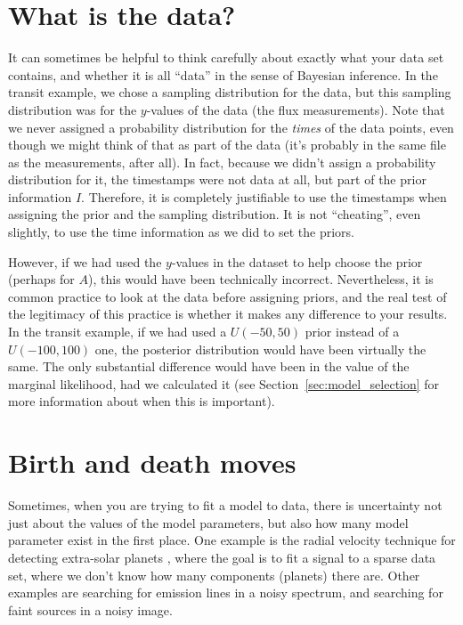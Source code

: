 \section{What is the data?}
It can sometimes be helpful to think carefully about exactly what your data set
contains, and whether it is all ``data'' in the sense of Bayesian inference.
In the transit example, we chose a sampling distribution for the data, but this
sampling distribution was for the $y$-values of the data
(the flux measurements). Note that we never assigned a probability distribution
for the {\it times} of the data points, even though we might think of that as
part of the data (it's probably in the same file as the measurements, after all).
In fact, because we didn't assign a probability distribution for it, the
timestamps were not data at all, but part of the prior information $I$.
Therefore, it is completely justifiable to use the timestamps when assigning
the prior and the sampling distribution. It is not ``cheating'', even slightly,
to use the time information as we did to set the priors.

However, if we had used the $y$-values in the dataset to help choose the prior
(perhaps for $A$), this would have been technically incorrect. Nevertheless,
it is common practice to look at the data before assigning priors, and the
real test of the legitimacy of this practice is whether it makes any difference
to your results. In the transit example, if we had used a $U(-50, 50)$ prior
instead of a $U(-100, 100)$ one, the posterior distribution would have been
virtually the same. The only substantial difference would have been in the
value of the marginal likelihood, had we calculated it
(see Section~\ref{sec:model_selection} for more information about when this
is important).

\section{Birth and death moves}
Sometimes, when you are trying to fit a model to data, there is uncertainty
not just about the values of the model parameters, but also how many model
parameter exist in the first place. One example is
the radial velocity technique for detecting extra-solar planets
\citep{gregory}, where the goal is to fit a signal to a sparse data set, where
we don't know how many components (planets) there are. Other examples are
searching for emission lines in a noisy spectrum, and searching for faint
sources in a noisy image.



